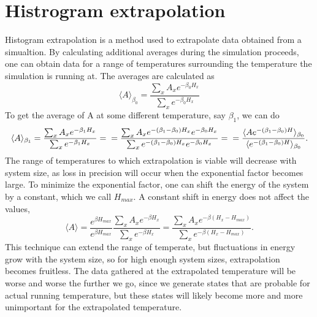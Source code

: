 \section{Histrogram extrapolation}
Histogram extrapolation is a method used to extrapolate data obtained from a simualtion.
By calculating additional averages during the simulation proceeds, one can obtain data for a range of temperatures surrounding the temperature the simulation is running at.
The averages are calculated as
\begin{equation}
  \langle A \rangle_{\beta_0} =  \frac{\sum_{x}A_x e^{-\beta_0 H_x}}{\sum_{x}e^{-\beta_0 H_x}}
\end{equation}
To get the average of A at some different temperature, say $\beta_1$, we can do
\begin{equation}
  \langle A \rangle_{\beta_1} =  \frac{\sum_{x}A_x e^{-\beta_1 H_x}}{\sum_{x}e^{- \beta_1 H_x}} = \\
  = \frac{\sum_x A_x e^{-(\beta_1 - \beta_0)H_x} e^{-\beta_0 H_x}}{\sum_x e^{-(\beta_1 - \beta_0)H_x}e^{-\beta_0 H_x}} = \\
  = \frac{\langle A e^{-(\beta_1 - \beta_0)H}\rangle_{\beta_0}}{\langle e^{-(\beta_1 - \beta_0)H}\rangle_{\beta_0}}.
\end{equation}
The range of temperatures to which extrapolation is viable will decrease with system size,
as loss in precision will occur when the exponential factor becomes large. To minimize the exponential factor, one can shift the energy of the system by a constant, which we call $H_{max}$. A constant shift in energy does not affect the values, 
\begin{equation}
  \langle A \rangle = \frac{e^{\beta H_{max}}}{e^{\beta H_{max}}}\frac{\sum_x A_x e^{-\beta H_x}}{\sum_x e^{-\beta H_x}}= \frac{\sum_x A_x e^{-\beta(H_x-H_{max})}}{\sum_x e^{-\beta(H_x-H_{max})}}.
  \label{}
\end{equation}
This technique can extend the range of temperate, but fluctuations in energy grow with the system size, so for high enough system sizes, extrapolation becomes fruitless.
The data gathered at the extrapolated temperature will be worse and worse the further we go, since we generate states that are probable for actual running temperature, but these states will likely become more and more unimportant for the extrapolated temperature.
